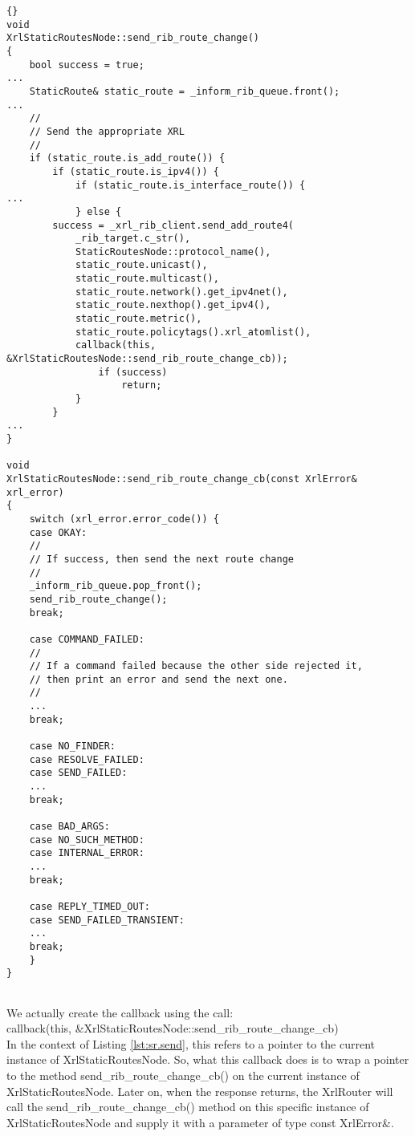 \documentclass[11pt]{article}
\begin{document}
\begin{lstlisting}[caption={Extracts from {\stt xorp/static\_routes/xrl\_static\_routes\_node.cc} %
                                     \label{lst:sr.send} } ]{}
void
XrlStaticRoutesNode::send_rib_route_change()
{
    bool success = true;
...
    StaticRoute& static_route = _inform_rib_queue.front();
...
    //
    // Send the appropriate XRL
    //
    if (static_route.is_add_route()) {
        if (static_route.is_ipv4()) {
            if (static_route.is_interface_route()) {
...
            } else {
		success = _xrl_rib_client.send_add_route4(
		    _rib_target.c_str(),
		    StaticRoutesNode::protocol_name(),
		    static_route.unicast(),
		    static_route.multicast(),
		    static_route.network().get_ipv4net(),
		    static_route.nexthop().get_ipv4(),
		    static_route.metric(),
		    static_route.policytags().xrl_atomlist(),
		    callback(this, &XrlStaticRoutesNode::send_rib_route_change_cb));
                if (success)
                    return;
            }
        }
...
}

void
XrlStaticRoutesNode::send_rib_route_change_cb(const XrlError& xrl_error)
{
    switch (xrl_error.error_code()) {
    case OKAY:
	//
	// If success, then send the next route change
	//
	_inform_rib_queue.pop_front();
	send_rib_route_change();
	break;

    case COMMAND_FAILED:
	//
	// If a command failed because the other side rejected it,
	// then print an error and send the next one.
	//
	...
	break;

    case NO_FINDER:
    case RESOLVE_FAILED:
    case SEND_FAILED:
	...
	break;

    case BAD_ARGS:
    case NO_SUCH_METHOD:
    case INTERNAL_ERROR:
	...
	break;

    case REPLY_TIMED_OUT:
    case SEND_FAILED_TRANSIENT:
	...
	break;
    }
}


\end{lstlisting}

\newpage

\noindent We actually create the callback using the call:\\
{\stt callback(this, \&XrlStaticRoutesNode::send\_rib\_route\_change\_cb)}\\
In the context of 
Listing \ref{lst:sr.send}, {\stt this} refers to a pointer to the
current instance of {\stt XrlStaticRoutesNode}.  So, what this
callback does is to wrap a pointer to the method {\stt
send\_rib\_route\_change\_cb()} on the current instance of {\stt
XrlStaticRoutesNode}.  Later on, when the response returns, the
XrlRouter will call the {\stt send\_rib\_route\_change\_cb()} method on
this specific instance of {\stt XrlStaticRoutesNode} and supply it
with a parameter of type {\stt const XrlError\&}.
\end{document}
